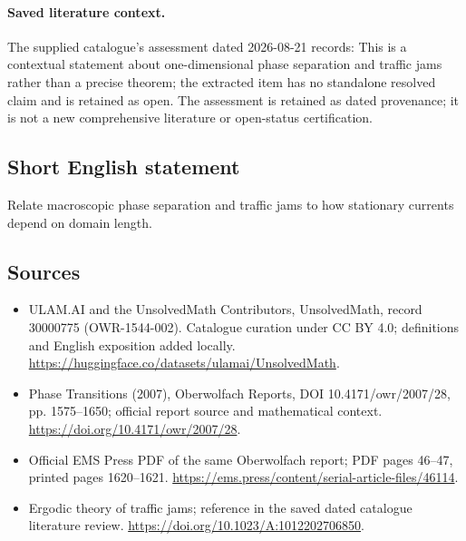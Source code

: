 \documentclass[11pt]{article}
\begin{document}
\paragraph{Saved literature context.} The supplied catalogue's assessment dated 2026-08-21 records: This is a contextual statement about one-dimensional phase separation and traffic jams rather than a precise theorem; the extracted item has no standalone resolved claim and is retained as open. The assessment is retained as dated provenance; it is not a new comprehensive literature or open-status certification.
\subsection{Short English statement}
Relate macroscopic phase separation and traffic jams to how stationary currents depend on domain length.
\subsection{Sources}
\begin{itemize}
\item[\hypertarget{source:30000775:1}{S1}] ULAM.AI and the UnsolvedMath Contributors, UnsolvedMath, record 30000775 (OWR-1544-002). Catalogue curation under CC BY 4.0; definitions and English exposition added locally.
\url{https://huggingface.co/datasets/ulamai/UnsolvedMath}.
\item[\hypertarget{source:30000775:2}{S2}] Phase Transitions (2007), Oberwolfach Reports, DOI 10.4171/owr/2007/28, pp. 1575--1650; official report source and mathematical context.
\url{https://doi.org/10.4171/owr/2007/28}.
\item[\hypertarget{source:30000775:3}{S3}] Official EMS Press PDF of the same Oberwolfach report; PDF pages 46--47, printed pages 1620--1621.
\url{https://ems.press/content/serial-article-files/46114}.
\item[\hypertarget{source:30000775:4}{S4}] Ergodic theory of traffic jams; reference in the saved dated catalogue literature review.
\url{https://doi.org/10.1023/A:1012202706850}.
\end{itemize}
\label{end:30000775}
\end{document}
